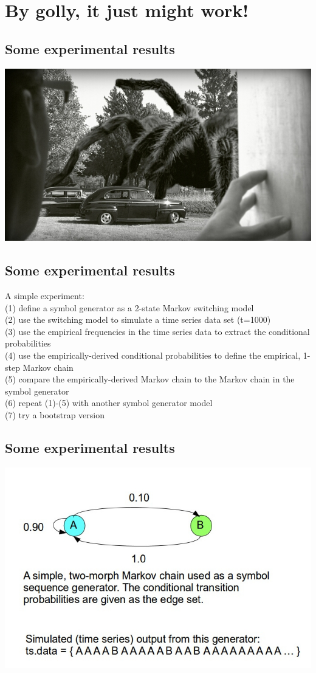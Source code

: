 \documentclass[
paper=128mm:96mm, %
fontsize=11pt, %
pagesize, %
parskip=half-, %
]{scrartcl} %
\theoremstyle{mythmstyle} %
\begin{document}
\section{By golly, it just might work!}
\subsection{Some experimental results}
\centering \includegraphics[height=4 cm]{Image25.jpg}
\clearpage
\subsection{Some experimental results}
\footnotesize
\begin{flushleft}
A simple experiment:\\
(1) define a symbol generator as a 2-state Markov switching model\\
(2) use the switching model to simulate a time series data set (t=1000)\\
(3) use the empirical frequencies in the time series data to extract the conditional probabilities\\
(4) use the empirically-derived conditional probabilities to define the empirical, 1-step Markov chain\\
(5) compare the empirically-derived Markov chain to the Markov chain in the symbol generator\\
(6) repeat (1)-(5) with another symbol generator model\\
(7) try a bootstrap version
\end{flushleft}

\clearpage
\subsection{Some experimental results}
\centering \includegraphics[height=5 cm]{Image26.jpg}
\end{document}
